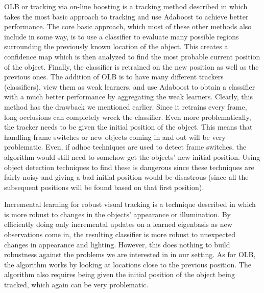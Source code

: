 \documentclass{article}
\begin{document}
OLB or tracking via on-line boosting is a tracking method described in \cite{OLB} which takes the most basic approach to tracking and use Adaboost to achieve better performance.
The core basic approach, which most of these other methods also include in some way, is to use a classifier to evaluate many possible regions surrounding the previously known location of the object.
This creates a confidence map which is then analyzed to find the most probable current position of the object. Finally, the classifier is retrained on the new position as well as the previous ones.
The addition of OLB is to have many different trackers (classifiers), view them as weak learners, and use Adaboost to obtain a classifier with a much better performance by aggregating the weak learners.
Clearly, this method has the drawback we mentioned earlier. Since it retrains every frame, long occlusions can completely wreck the classifier. Even more problematically, the tracker needs to be given the
initial position of the object. This means that handling frame switches or new objects coming in and out will be very problematic. Even, if adhoc techniques are used to detect frame switches, the algorithm
would still need to somehow get the objects' new initial position. Using object detection techniques to find these is dangerous since these techniques are fairly noisy and giving a bad initial position would
be disastrous (since all the subsequent positions will be found based on that first position).

Incremental learning for robust visual tracking is a technique described in \cite{IVT} which is more robust to changes in the objects' appearance or illumination. By efficiently doing only incremental updates
on a learned eigenbasis as new observations come in, the resulting classifier is more robust to unexpected changes in appearance and lighting. However, this does nothing to build robustness against the problems
we are interested in in our setting. As for OLB, the algorithm works by looking at locations close to the previous position. The algorithm also requires being given the initial position of the
object being tracked, which again can be very problematic.
\end{document}
